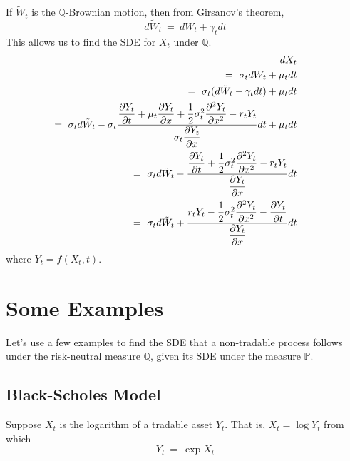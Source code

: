 \documentclass[uplatex,a4j,12pt,dvipdfmx]{jsarticle}
\begin{document}
If $\tilde{W}_{t}$ is the $\mathbb{Q}$-Brownian motion, then from Girsanov's theorem,
$$
	d \tilde{W}_{t}
	\ = \
	d W_{t} + \gamma_{t} dt
$$
This allows us to find the SDE for $X_{t}$ under $\mathbb{Q}$.
%
%
\begin{eqnarray*}
	&&
	\hspace{-10mm}
	d X_{t}
	\\ && \hspace{-10mm} = \
	\sigma_{t} d W_{t} + \mu_{t} dt
	\\ && \hspace{-10mm} = \
	\sigma_{t} (d \tilde{W}_{t} - \gamma_{t} dt) + \mu_{t} dt
	\\ && \hspace{-10mm} = \
	\sigma_{t} d \tilde{W}_{t} - \sigma_{t}
	\dfrac{
		\dfrac{ \partial Y_{t} }{ \partial t }
		+
		\mu_{t}
		\dfrac{ \partial Y_{t} }{ \partial x }
		+
		\dfrac{1}{2}
		\sigma_{t}^{2}
		\dfrac{ \partial^{2} Y_{t} }{ \partial x^{2} } - r_{t} Y_{t}
	}
	{ \sigma_{t}
		\dfrac{ \partial Y_{t} }{ \partial x }
	}
	dt + \mu_{t} dt
	\\ && \hspace{-10mm} = \
	\sigma_{t} d \tilde{W}_{t}
	-
	\dfrac{
		\dfrac{ \partial Y_{t} }{ \partial t }
		+
		\dfrac{1}{2}
		\sigma_{t}^{2}
		\dfrac{ \partial^{2} Y_{t} }{ \partial x^{2} } - r_{t} Y_{t}
	}
	{
		\dfrac{ \partial Y_{t} }{ \partial x }
	}
	dt
	\\ && \hspace{-10mm} = \
	\sigma_{t} d \tilde{W}_{t}
	+
	\dfrac{
		r_{t} Y_{t}
		-
		\dfrac{1}{2}
		\sigma_{t}^{2}
		\dfrac{ \partial^{2} Y_{t} }{ \partial x^{2} }
		-
		\dfrac{ \partial Y_{t} }{ \partial t }
	}
	{
		\dfrac{ \partial Y_{t} }{ \partial x }
	}
	dt
\end{eqnarray*}
%
%
where $Y_{t} = f(X_{t},t)$.

\section{Some Examples}

Let's use a few examples to find the SDE that a non-tradable process follows under the risk-neutral measure $\mathbb{Q}$, given its SDE under the measure $\mathbb{P}$.

\subsection{Black-Scholes Model}

Suppose $X_{t}$ is the logarithm of a tradable asset $Y_{t}$.
That is,
$
	X_{t}
	=
	\log Y_{t}
$
from which
$$
	Y_{t}
	\ = \
	\exp X_{t}
$$
\end{document}
